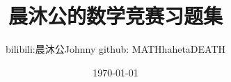 \documentclass{plainbook}
\title{晨沐公的数学竞赛习题集}
\author{bilibili:晨沐公Johnny \quad github: MATHhahetaDEATH}
\date{\today}
\begin{document}
\frontmatter



\maketitle\pagebreak

% 





% 

% 

\tableofcontents

\mainmatter










% 

% 

% 

% 

% 

% 

% 

\end{document}
